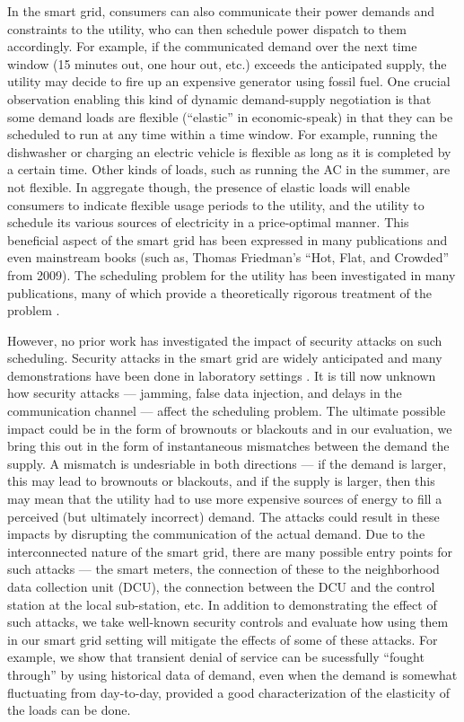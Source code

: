 \documentclass[conference]{IEEEtran}
\begin{document}
In the smart grid, consumers can also communicate their power demands and constraints to the utility, who can then schedule
power dispatch to them accordingly.  For example, if the communicated demand over the next time window (15 minutes out, one hour out, etc.) exceeds the anticipated supply, the utility may decide to fire up an expensive generator using fossil fuel. One crucial observation enabling this kind of dynamic demand-supply negotiation is that some demand loads are flexible (``elastic'' in economic-speak) in that they can be scheduled to run at any time within a time window. For example, running the dishwasher or charging an electric vehicle is flexible as long as it is completed by a certain time. Other kinds of loads, such as running the AC in the summer, are not flexible. In aggregate though, the presence of elastic loads will enable consumers to indicate flexible usage periods to the utility, and the utility to schedule its various sources of electricity in a price-optimal manner. This beneficial aspect of the smart grid has been expressed in many publications and even mainstream books (such as, Thomas Friedman's ``Hot, Flat, and Crowded'' from 2009). The scheduling problem for the utility has been investigated in many publications, many of which provide a theoretically rigorous treatment of the problem \cite{petersen2013taxonomy}. 

However, no prior work has investigated the impact of security attacks on such scheduling. Security attacks in the smart grid are widely anticipated \cite{nist} and many demonstrations have been done in laboratory settings \cite{hussain2012ncs}. It is till now unknown how security attacks --- jamming, false data injection, and delays in the communication channel --- affect the scheduling problem. The ultimate possible impact could be in the form of brownouts or blackouts and in our evaluation, we bring this out in the form of instantaneous mismatches between the demand the supply. A mismatch is undesriable in both directions --- if the demand is larger, this may lead to brownouts or blackouts, and if the supply is larger, then this may mean that the utility had to use more expensive sources of energy to fill a perceived (but ultimately incorrect) demand. The attacks could result in these impacts by disrupting the communication of the actual demand. Due to the interconnected nature of the smart grid, there are many possible entry points for such attacks --- the smart meters, the connection of these to the neighborhood data collection unit (DCU), the connection between the DCU and the control station at the local sub-station, etc. In addition to demonstrating the effect of such attacks, we take well-known security controls and evaluate how using them in our smart grid setting will mitigate the effects of some of these attacks. For example, we show that transient denial of service can be sucessfully ``fought through'' by using historical data of demand, even when the demand is somewhat fluctuating from day-to-day, provided a good characterization of the elasticity of the loads can be done. 
\end{document}
